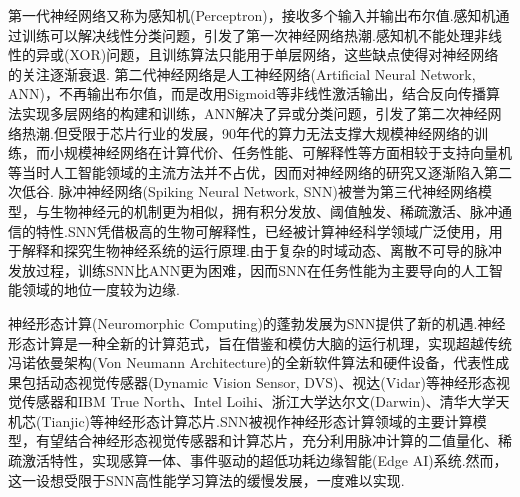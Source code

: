 \documentclass{SCIS2020cn}
\begin{document}
第一代神经网络又称为感知机(Perceptron)\cite{rosenblatt1958perceptron}，接收多个输入并输出布尔值.感知机通过训练可以解决线性分类问题，引发了第一次神经网络热潮.感知机不能处理非线性的异或(XOR)问题，且训练算法只能用于单层网络，这些缺点使得对神经网络的关注逐渐衰退.
第二代神经网络是人工神经网络(Artificial Neural Network, ANN)，不再输出布尔值，而是改用Sigmoid等非线性激活输出，结合反向传播算法\cite{rumelhart1986learning}实现多层网络的构建和训练，ANN解决了异或分类问题，引发了第二次神经网络热潮.但受限于芯片行业的发展，90年代的算力无法支撑大规模神经网络的训练，而小规模神经网络在计算代价、任务性能、可解释性等方面相较于支持向量机\cite{cortes1995support}等当时人工智能领域的主流方法并不占优，因而对神经网络的研究又逐渐陷入第二次低谷.
脉冲神经网络(Spiking Neural Network, SNN)被誉为第三代神经网络模型\cite{maass1997networks}，与生物神经元的机制更为相似，拥有积分发放、阈值触发、稀疏激活、脉冲通信的特性.SNN凭借极高的生物可解释性，已经被计算神经科学领域广泛使用\cite{gewaltig2007nest, spaun, Stimberg2019}，用于解释和探究生物神经系统的运行原理.由于复杂的时域动态、离散不可导的脉冲发放过程，训练SNN比ANN更为困难，因而SNN在任务性能为主要导向的人工智能领域的地位一度较为边缘.

神经形态计算(Neuromorphic Computing)\cite{mead1990neuromorphic, roy2019towards}的蓬勃发展为SNN提供了新的机遇.神经形态计算是一种全新的计算范式，旨在借鉴和模仿大脑的运行机理，实现超越传统冯诺依曼架构(Von Neumann Architecture)的全新软件算法和硬件设备，代表性成果包括动态视觉传感器(Dynamic Vision Sensor, DVS)\cite{lichtsteiner2008128}、视达(Vidar)\cite{dong2017spike}等神经形态视觉传感器和IBM True North\cite{merolla2014million}、Intel Loihi\cite{loihi}、浙江大学达尔文(Darwin)\cite{ma2017darwin}、清华大学天机芯(Tianjic)\cite{pei2019towards}等神经形态计算芯片.SNN被视作神经形态计算领域的主要计算模型，有望结合神经形态视觉传感器和计算芯片，充分利用脉冲计算的二值量化、稀疏激活特性，实现感算一体、事件驱动的超低功耗边缘智能(Edge AI)系统\cite{roy2019towards}.然而，这一设想受限于SNN高性能学习算法的缓慢发展，一度难以实现.
\end{document}
